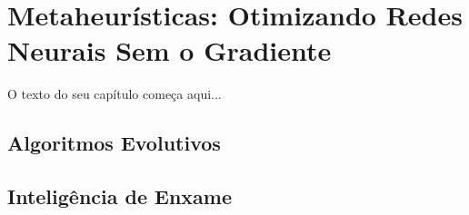 
\chapter{Metaheurísticas: Otimizando Redes Neurais Sem o Gradiente}
\label{cap:otimizacao-metaheuristicas}

O texto do seu capítulo começa aqui...

\section{Algoritmos Evolutivos}

\section{Inteligência de Enxame}